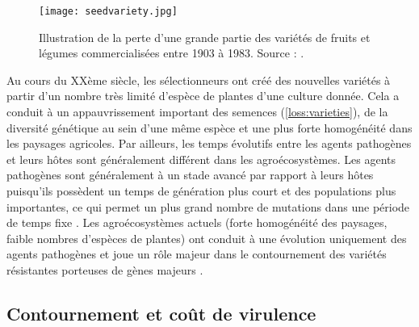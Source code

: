 
	\begin{figure}[p]
		\centering \texttt{[image: seedvariety.jpg]}
		\caption[Perte des variétés ]{Illustration de la perte d’une grande partie 
		         des variétés de fruits et légumes
                 commercialisées entre 1903 à 1983. Source : \citet{NG2011}.}
		\label{loss:varieties}
	\end{figure}

      Au cours du XXème siècle, les sélectionneurs ont créé des nouvelles variétés à partir d'un nombre très limité d'espèce de plantes  d'une culture donnée. 
Cela  a conduit à un appauvrissement important des semences (\autoref{loss:varieties}), de la diversité génétique au sein d'une même espèce  et une plus forte homogénéité dans les paysages agricoles. Par ailleurs, les temps évolutifs entre les agents pathogènes et leurs hôtes sont généralement différent dans les agroécosystèmes. Les agents pathogènes sont généralement à un stade avancé par rapport à leurs hôtes puisqu'ils possèdent un temps de génération plus court et des populations plus importantes, ce qui permet un plus grand nombre de mutations dans une période de temps fixe \citep{Zhan2014}.
Les agroécosystèmes actuels (forte homogénéité des paysages, faible nombres d'espèces de plantes) ont conduit à une évolution uniquement  des agents pathogènes et joue  un rôle majeur dans le contournement des variétés résistantes porteuses de gènes majeurs \citep{Stukenbrock2008}.


\subsection{Contournement et  coût de virulence}
\label{contournement}

